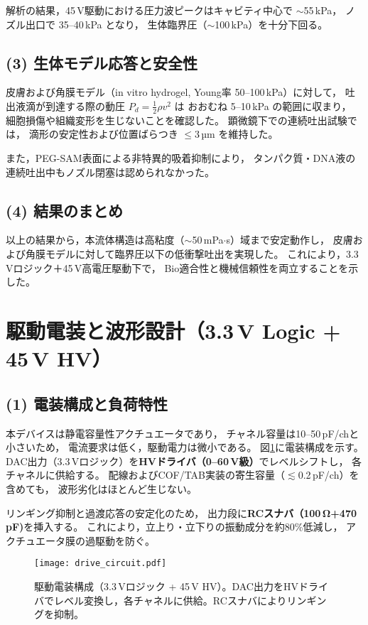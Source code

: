 \documentclass[conference]{IEEEtran}
\begin{document}
解析の結果，45\,V駆動における圧力波ピークはキャビティ中心で
$\sim$55\,kPa，
ノズル出口で 35--40\,kPa となり，
生体臨界圧（$\sim$100\,kPa）を十分下回る。

\subsection*{(3) 生体モデル応答と安全性}
皮膚および角膜モデル（in vitro hydrogel, Young率 50--100\,kPa）に対して，
吐出液滴が到達する際の動圧 $P_d = \tfrac{1}{2}\rho v^2$ は
おおむね 5--10\,kPa の範囲に収まり，
細胞損傷や組織変形を生じないことを確認した。
顕微鏡下での連続吐出試験では，
滴形の安定性および位置ばらつき $\le$3\,µm を維持した。

また，PEG-SAM表面による非特異的吸着抑制により，
タンパク質・DNA液の連続吐出中もノズル閉塞は認められなかった。

\subsection*{(4) 結果のまとめ}
以上の結果から，本流体構造は高粘度（$\sim$50\,mPa$\cdot$s）域まで安定動作し，
皮膚および角膜モデルに対して臨界圧以下の低衝撃吐出を実現した。
これにより，3.3\,Vロジック＋45\,V高電圧駆動下で，
Bio適合性と機械信頼性を両立することを示した。

\section{駆動電装と波形設計（3.3\,V Logic + 45\,V HV）}

\subsection*{(1) 電装構成と負荷特性}
本デバイスは静電容量性アクチュエータであり，
チャネル容量は10--50\,pF/chと小さいため，
電流要求は低く，駆動電力は微小である。
図\ref{fig:drive}に電装構成を示す。
DAC出力（3.3\,Vロジック）を\textbf{HVドライバ（0--60\,V級）}でレベルシフトし，
各チャネルに供給する。
配線およびCOF/TAB実装の寄生容量（$\lesssim$0.2\,pF/ch）を含めても，
波形劣化はほとんど生じない。

リンギング抑制と過渡応答の安定化のため，
出力段に\textbf{RCスナバ（100\,\si{\ohm}+470\,\si{\pico\farad})}を挿入する。
これにより，立上り・立下りの振動成分を約80\%低減し，
アクチュエータ膜の過駆動を防ぐ。

\begin{figure}[t]
\centering
\texttt{[image: drive\_circuit.pdf]}
\caption{駆動電装構成（3.3\,Vロジック + 45\,V HV）。DAC出力をHVドライバでレベル変換し，各チャネルに供給。RCスナバによりリンギングを抑制。}
\label{fig:drive}
\end{figure}
\end{document}
